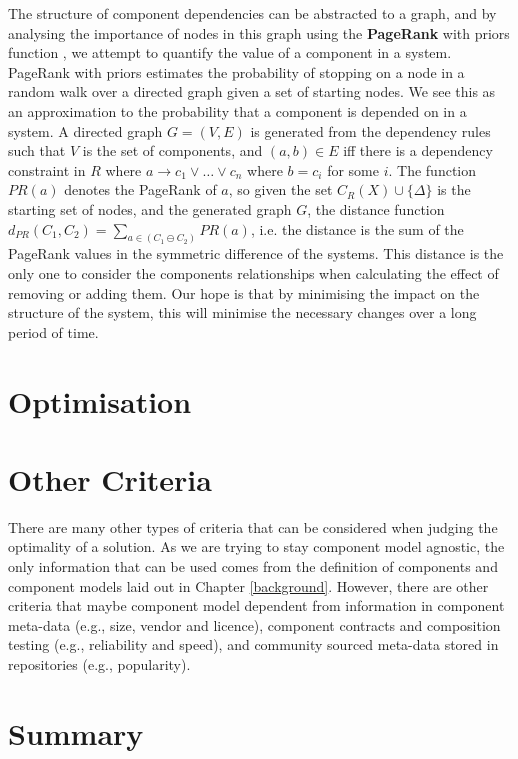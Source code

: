 The structure of component dependencies can be abstracted to a graph, 
and by analysing the importance of nodes in this graph using the \textbf{PageRank} with priors function \cite{White:2003:AER:956750.956782}, 
we attempt to quantify the value of a component in a system.
PageRank with priors estimates the probability of stopping on a node in a random walk over a directed graph given a set of starting nodes.
We see this as an approximation to the probability that a component is depended on in a system.
A directed graph $G = (V,E)$ is generated from the
dependency rules such that $V$ is the set of components, and $(a,b) \in E$ iff there is a dependency constraint in $R$ 
where $a \rightarrow c_1 \vee \ldots \vee c_n$ where $b = c_i$ for some $i$.
The function $PR(a)$ denotes the PageRank of $a$,
so given the set $C_R(X) \cup \{\Delta\}$ is the starting set of nodes, and the generated graph $G$,
the distance function $d_{PR}(C_1,C_2) = \sum_{a \in (C_1 \ominus C_2)} PR(a)$,
i.e. the distance is the sum of the PageRank values in the symmetric difference of the systems.
This distance is the only one to consider the components relationships when calculating the effect of removing or adding them.
Our hope is that by minimising the impact on the structure of the system, 
this will minimise the necessary changes over a long period of time.



\section{Optimisation}

\section{Other Criteria}
{}There are many other types of criteria that can be considered when judging the optimality of a solution.
{}As we are trying to stay component model agnostic, the only information that can be used comes from the definition of components and component models laid out in Chapter \ref{background}.
{}However, there are other criteria that maybe component model dependent from information in component meta-data (e.g., size, vendor and licence),
{}component contracts and composition testing (e.g., reliability and speed),
{}and community sourced meta-data stored in repositories (e.g., popularity).





\section{Summary}


